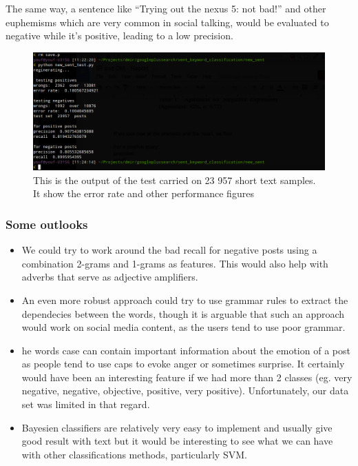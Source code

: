 The same way, a sentence like “Trying out the nexus 5: not bad!” and other euphemisms which are very common in social talking, would be
evaluated to negative while it’s positive, leading to a low precision.

\begin{figure}[h]
\centering
\includegraphics[scale=.4]{images/sent2.png}
\caption{This is the output of the test carried on 23 957 short text samples. It show the error rate and other performance figures}
\end{figure}



\subsubsection*{Some outlooks}
\begin{itemize}
 \item
 We could try to work around the bad recall for negative posts using a combination 2-grams and 1-grams as features. This would also help with adverbs that serve as adjective amplifiers.
\item
An even more robust approach could try to use grammar rules to extract the dependecies between the words, though it is arguable that such an approach would work on social media content, as the users tend to use poor grammar.
\item
he words case can contain important information about the emotion of a post as people tend to use caps to evoke anger or sometimes surprise. It certainly would have been an interesting feature if we had more than 2 classes (eg. very negative, negative, objective, positive, very positive). Unfortunately, our data set was limited in that regard.
\item
Bayesien classifiers are relatively very easy to implement and usually give good result with text but it would be interesting to see what we can have with other classifications methods, particularly SVM.

\end{itemize}

